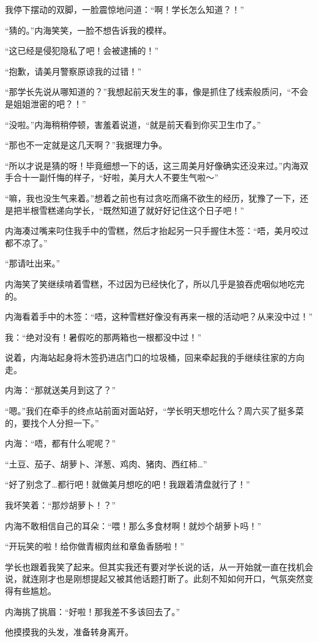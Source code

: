 我停下摆动的双脚，一脸震惊地问道：“啊！学长怎么知道？！”

“猜的。”内海笑笑，一脸不想告诉我的模样。

“这已经是侵犯隐私了吧！会被逮捕的！”

“抱歉，请美月警察原谅我的过错！”

“那学长先说从哪知道的？”我想起前天发生的事，像是抓住了线索般质问，“不会是姐姐泄密的吧？！”

“没啦。”内海稍稍停顿，害羞着说道，“就是前天看到你买卫生巾了。”

“那也不一定就是这几天啊？”我据理力争。

“所以才说是猜的呀！毕竟细想一下的话，这三周美月好像确实还没来过。”内海双手合十一副忏悔的样子，“好啦，美月大人不要生气啦～”

“嘛，我也没生气来着。”想着之前也有过贪吃而痛不欲生的经历，犹豫了一下，还是把半根雪糕递向学长，“既然知道了就好好记住这个日子吧！”

内海凑过嘴来叼住我手中的雪糕，然后才抬起另一只手握住木签：“唔，美月咬过都不凉了。”

“那请吐出来。”

内海笑了笑继续啃着雪糕，不过因为已经快化了，所以几乎是狼吞虎咽似地吃完的。

内海看着手中的木签：“唔，这种雪糕好像没有再来一根的活动吧？从来没中过！”

我：“绝对没有！暑假吃的那两箱也一根都没中过！”

说着，内海站起身将木签扔进店门口的垃圾桶，回来牵起我的手继续往家的方向走。

内海：“那就送美月到这了？”

“嗯。”我们在牵手的终点站前面对面站好，“学长明天想吃什么？周六买了挺多菜的，要找个人分担一下。”

内海：“唔，都有什么呢呢？”

“土豆、茄子、胡萝卜、洋葱、鸡肉、猪肉、西红柿…”

“好了别念了…都行吧！就做美月想吃的吧！我跟着清盘就行了！”

我坏笑着：“那炒胡萝卜！？”

内海不敢相信自己的耳朵：“喂！那么多食材啊！就炒个胡萝卜吗！”

“开玩笑的啦！给你做青椒肉丝和章鱼香肠啦！”

学长也跟着我笑了起来。但其实我还有要对学长说的话，从一开始就一直在找机会说，就连刚才也是刚想提起又被其他话题打断了。此刻不知如何开口，气氛突然变得有些尴尬。

内海挑了挑眉：“好啦！那我差不多该回去了。”

他摸摸我的头发，准备转身离开。

